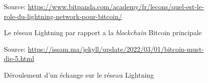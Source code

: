 \begin{figure}[h!]  
  
    \centering
    {\scriptsize Source: \url{https://www.bitpanda.com/academy/fr/lecons/quel-est-le-role-du-lightning-network-pour-bitcoin/}}
        \caption{Le réseau Lightning par rapport a la \textit{\gls{blockchain}} \gls{Bitcoin} principale}
        \label{fig:lightningCouche}
    \end{figure}

\begin{figure}[h!]
    \centering
    {\scriptsize Source: \url{https://issam.ma/jekyll/update/2022/03/01/bitcoin-must-die-5.html}}
    \caption{Déroulement d'un échange sur le réseau Lightning}
    \label{fig:lightningNetwork}
\end{figure}

